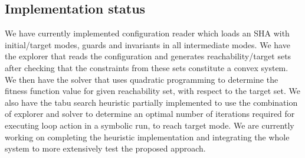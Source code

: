 \subsection{Implementation status}
We have currently implemented configuration reader which loads an SHA with initial/target modes, guards and invariants in all intermediate modes. We have the explorer that reads the configuration and generates reachability/target sets after checking that the constraints from these sets constitute a convex system. We then have the solver that uses quadratic programming to determine the fitness function value for given reachability set, with respect to the target set. We also have the tabu search heuristic partially implemented to use the combination of explorer and solver to determine an optimal number of iterations required for executing loop action in a symbolic run, to reach target mode. We are currently working on completing the heuristic implementation and integrating the whole system to more extensively test the proposed approach.   
